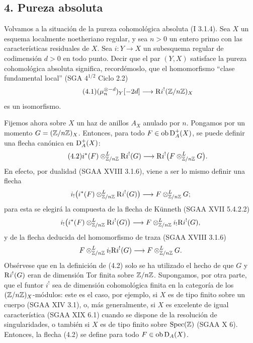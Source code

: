 \subsection*{4. Pureza absoluta}

Volvamos a la situación de la pureza cohomológica absoluta (I 3.1.4). Sea $X$ un esquema localmente noetheriano regular, y sea $n>0$ un entero primo con las características residuales de $X$. Sea $i:Y\to X$ un subesquema regular de codimensión $d>0$ en todo punto. Decir que el par $(Y,X)$ satisface la pureza cohomológica absoluta significa, recordémoslo, que el homomorfismo ``clase fundamental local'' (SGA $4^{1/2}$ Ciclo 2.2)
\begin{equation}\tag{4.1}
        (\mu_n^{\otimes -d})_Y[-2d]\longrightarrow \mathrm{R} i^!(\mathbb{Z}/n\mathbb{Z})_X
\end{equation}
es un isomorfismo.

Fijemos ahora sobre $X$ un haz de anillos $A_X$ anulado por $n$. Pongamos por un momento $G=(\mathbb{Z}/n\mathbb{Z})_X$. Entonces, para todo $F\in\operatorname{ob}\mathrm{D}_A^+(X)$, se puede definir una flecha canónica en $\mathrm{D}_A^+(X)$:
\begin{equation}\tag{4.2}
        i^*(F)\otimes^L_{\mathbb{Z}/n\mathbb{Z}} \mathrm{R} i^!(G)\longrightarrow \mathrm{R} i^!\bigl(F\otimes^L_{\mathbb{Z}/n\mathbb{Z}}G\bigr).
\end{equation}
En efecto, por dualidad (SGAA XVIII 3.1.6), viene a ser lo mismo definir una flecha
\[
        i_!\bigl(i^*(F)\otimes^L_{\mathbb{Z}/n\mathbb{Z}}\mathrm{R} i^!(G)\bigr)\longrightarrow F\otimes^L_{\mathbb{Z}/n\mathbb{Z}}G;
\]
para esta se elegirá la compuesta de la flecha de Künneth (SGAA XVII 5.4.2.2)
\[
        i_!\bigl(i^*(F)\otimes^L_{\mathbb{Z}/n\mathbb{Z}}\mathrm{R} i^!(G)\bigr)\longrightarrow F\otimes^L_{\mathbb{Z}/n\mathbb{Z}}i_!\mathrm{R} i^!(G),
\]
y de la flecha deducida del homomorfismo de traza (SGAA XVIII 3.1.6)
\[
        F\otimes^L_{\mathbb{Z}/n\mathbb{Z}}i_!\mathrm{R} i^!(G)\longrightarrow F\otimes^L_{\mathbb{Z}/n\mathbb{Z}}G.
\]
Obsérvese que en la definición de (4.2) solo se ha utilizado el hecho de que $G$ y $\mathrm{R} i^!(G)$ eran de dimensión Tor finita sobre $\mathbb{Z}/n\mathbb{Z}$. Supongamos, por otra parte, que el funtor $i^!$ sea de dimensión cohomológica finita en la categoría de los $(\mathbb{Z}/n\mathbb{Z})_X$-módulos: este es el caso, por ejemplo, si $X$ es de tipo finito sobre un cuerpo (SGAA XIV 3.1), o, más generalmente, si $X$ es excelente de igual característica (SGAA XIX 6.1) cuando se dispone de la resolución de singularidades, o también si $X$ es de tipo finito sobre $\operatorname{Spec}(\mathbb{Z})$ (SGAA X 6). Entonces, la flecha (4.2) se define para todo $F\in\operatorname{ob}\mathrm{D}_A(X)$.

